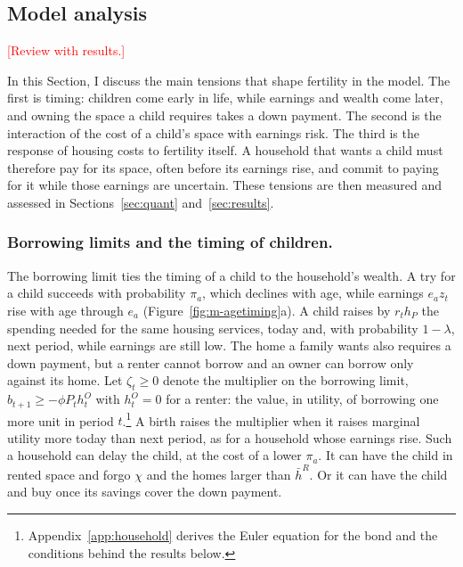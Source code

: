 \subsection{Model analysis}
\label{sec:m-analysis}

\textcolor{red}{[Review with results.]}

In this Section, I discuss the main tensions that shape fertility in the
model. The first is timing: children come early in life, while earnings and
wealth come later, and owning the space a child requires takes a down
payment. The second is the interaction of the cost of a child's space with
earnings risk. The third is the response of housing costs to fertility
itself. A household that wants a child must therefore pay for its
space, often before its earnings rise, and commit to paying for it while
those earnings are uncertain. These tensions are then measured and assessed
in Sections~\ref{sec:quant} and~\ref{sec:results}.

\subsubsection*{Borrowing limits and the timing of children.}
The borrowing limit ties the timing of a child to the household's wealth. A
try for a child succeeds with probability $\pi_a$, which declines with age,
while earnings $e_az_t$ rise with age through $e_a$
(Figure~\ref{fig:m-agetiming}a). A child raises by $r_th_P$ the spending
needed for the same housing services, today and, with probability
$1-\lambda$, next period, while earnings are still low. The home a family
wants also requires a down payment, but a renter cannot borrow and an owner
can borrow only against its home. Let $\zeta_t\ge0$ denote the multiplier on
the borrowing limit, $b_{t+1}\ge-\phi P_th^O_t$ with $h^O_t=0$ for a renter:
the value, in utility, of borrowing one more unit in period
$t$.\footnote{Appendix~\ref{app:household} derives the Euler equation for the
bond and the conditions behind the results below.} A birth raises the
multiplier when it raises marginal utility more today than next period, as
for a household whose earnings rise. Such a household can delay the child, at
the cost of a lower $\pi_a$. It can have the child in rented space and forgo
$\chi$ and the homes larger than $\bar h^R$. Or it can have the child and buy
once its savings cover the down payment.


